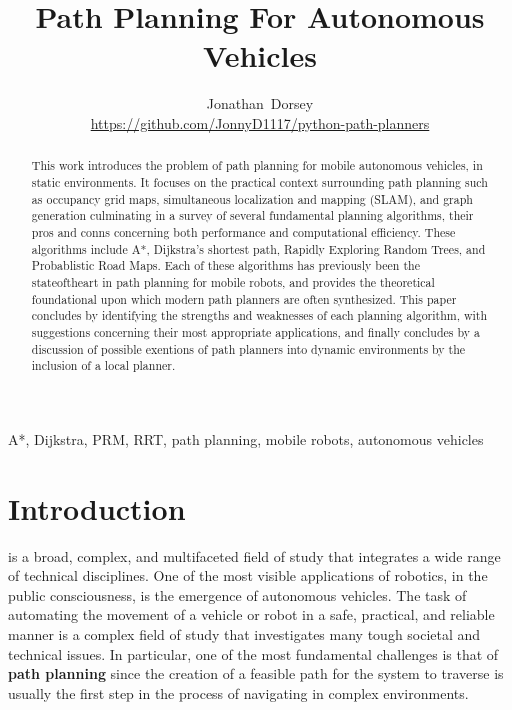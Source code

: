 \documentclass[journal]{IEEEtran}
\begin{document}
\title{Path Planning For Autonomous Vehicles}


\author{Jonathan~Dorsey  \\  \url{https://github.com/JonnyD1117/python-path-planners}}


\maketitle

\begin{abstract}
  This work introduces the problem of path planning for mobile autonomous vehicles, in static environments. It focuses on the practical context surrounding path planning such as occupancy grid maps, simultaneous localization and mapping (SLAM), and graph generation culminating in a survey of several fundamental planning algorithms, their pros and conns concerning both performance and computational efficiency. These algorithms include A*, Dijkstra's shortest path, Rapidly Exploring Random Trees, and Probablistic Road Maps. Each of these algorithms has previously been the stateoftheart in path planning for mobile robots, and provides the theoretical foundational upon which modern path planners are often synthesized. This paper concludes by identifying the strengths and weaknesses of each planning algorithm, with suggestions concerning their most appropriate applications, and finally concludes by a discussion of possible exentions of path planners into dynamic environments by the inclusion of a local planner.  
  
\end{abstract}

\begin{IEEEkeywords}
	A*, Dijkstra, PRM, RRT, path planning, mobile robots, autonomous vehicles
\end{IEEEkeywords}


\IEEEpeerreviewmaketitle

\section{Introduction}


 is a broad, complex, and multifaceted field of study that integrates a wide range of technical disciplines. One of the most visible applications of robotics, in the public consciousness, is the emergence of autonomous vehicles. The task of automating the movement of a vehicle or robot in a safe, practical, and reliable manner is a complex field of study that investigates many tough societal and technical issues. In particular, one of the most fundamental challenges is that of \textbf{path planning} since the creation of a feasible path for the system to traverse is usually the first step in the process of navigating in complex environments. \\
\end{document}
